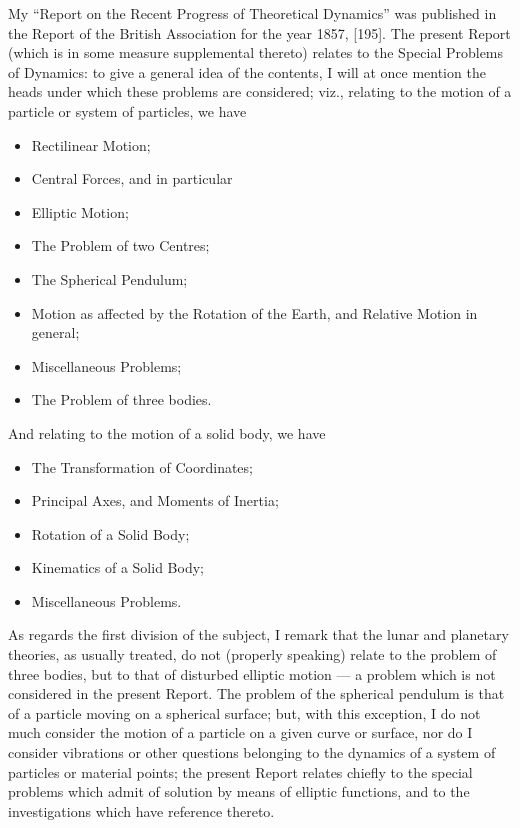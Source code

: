\documentclass[11pt,a4paper]{article}
\begin{document}
My ``Report on the Recent Progress of Theoretical Dynamics'' was published in the Report of the British Association for the year 1857, [195]. The present Report (which is in some measure supplemental thereto) relates to the Special Problems of Dynamics: to give a general idea of the contents, I will at once mention the heads under which these problems are considered; viz., relating to the motion of a particle or system of particles, we have
\begin{itemize}[noitemsep]
\item Rectilinear Motion;
\item Central Forces, and in particular
\item[] Elliptic Motion;
\item The Problem of two Centres;
\item The Spherical Pendulum;
\item Motion as affected by the Rotation of the Earth, and Relative Motion in general;
\item Miscellaneous Problems;
\item The Problem of three bodies.
\end{itemize}
And relating to the motion of a solid body, we have
\begin{itemize}[noitemsep]
\item The Transformation of Coordinates;
\item Principal Axes, and Moments of Inertia;
\item Rotation of a Solid Body;
\item Kinematics of a Solid Body;
\item Miscellaneous Problems.
\end{itemize}

\newpage
\setcounter{page}{514}

As regards the first division of the subject, I remark that the lunar and planetary theories, as usually treated, do not (properly speaking) relate to the problem of three bodies, but to that of disturbed elliptic motion --- a problem which is not considered in the present Report. The problem of the spherical pendulum is that of a particle moving on a spherical surface; but, with this exception, I do not much consider the motion of a particle on a given curve or surface, nor do I consider vibrations or other questions belonging to the dynamics of a system of particles or material points; the present Report relates chiefly to the special problems which admit of solution by means of elliptic functions, and to the investigations which have reference thereto.
\end{document}
